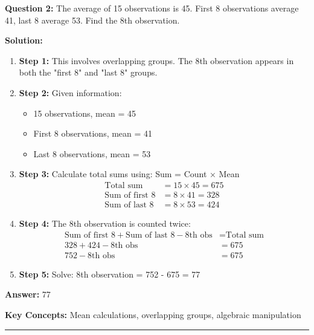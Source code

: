 \textbf{Question 2:} The average of 15 observations is 45. First 8 observations average 41, last 8 average 53. Find the 8th observation.

\textbf{Solution:}
\begin{enumerate}
\item \textbf{Step 1:} This involves overlapping groups. The 8th observation appears in both the "first 8" and "last 8" groups.

\item \textbf{Step 2:} Given information:
\begin{itemize}
\item 15 observations, mean = 45
\item First 8 observations, mean = 41
\item Last 8 observations, mean = 53
\end{itemize}

\item \textbf{Step 3:} Calculate total sums using: Sum = Count × Mean
\begin{align}
\text{Total sum} &= 15 \times 45 = 675 \\
\text{Sum of first 8} &= 8 \times 41 = 328 \\
\text{Sum of last 8} &= 8 \times 53 = 424
\end{align}

\item \textbf{Step 4:} The 8th observation is counted twice:
\begin{align}
\text{Sum of first 8} + \text{Sum of last 8} - \text{8th obs} &= \text{Total sum} \\
328 + 424 - \text{8th obs} &= 675 \\
752 - \text{8th obs} &= 675
\end{align}

\item \textbf{Step 5:} Solve: 8th observation = 752 - 675 = 77
\end{enumerate}

\textbf{Answer:} 77

\textbf{Key Concepts:} Mean calculations, overlapping groups, algebraic manipulation

\hrule
\vspace{1em}
